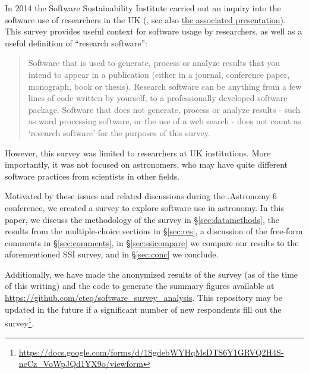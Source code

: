 In 2014 the Software Sustainability Institute carried out an inquiry into the software use of researchers in the UK  (\cite{f824cd98-b953-4c08-96c8-2533188bc4c4}, see also \href{http://wl.figshare.com/articles/1243288/embed?show_title=1}{the associated presentation}). This survey provides useful context for software usage by researchers, as well as a useful definition of ``research software'':
\begin{quote}
Software that is used to generate, process or analyze results that you intend to appear in a publication (either in a journal, conference paper, monograph, book or thesis). Research software can be anything from a few lines of code written by yourself, to a professionally developed software package. Software that does not generate, process or analyze results - such as word processing software, or the use of a web search - does not count as ‘research software’ for the purposes of this survey.
\end{quote}
However, this survey was limited to researchers at UK institutions.  More importantly, it was not focused on astronomers, who may have quite different software practices from scientists in other fields.

Motivated by these issues and related discussions during the .Astronomy 6 conference, we created a survey to explore software use in astronomy.  In this paper, we discuss the methodology of the survey in \S \ref{sec:datamethods}, the results from the multiple-choice sections in \S \ref{sec:res}, a discussion of the free-form comments in \S \ref{sec:comments}, in \S \ref{sec:ssicompare} we compare our results to the aforementioned SSI survey, and in \S \ref{sec:conc} we conclude.

Additionally, we have made the anonymized results of the survey (as of the time of this writing) and the code to generate the summary figures available at \url{https://github.com/eteq/software_survey_analysis}. This repository may be updated in the future if a significant number of new respondents fill out the survey\footnote{\url{https://docs.google.com/forms/d/1SgdebWYHqMsDTS6Y1GRVQ2H4S-ncCz_VoWpJQd1YX9o/viewform}}.
    
  
  
  
  